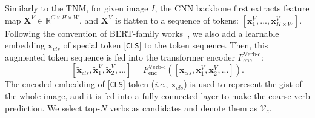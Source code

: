 \documentclass[letterpaper]{article} %
\newcommand{\ie}{\textit{i}.\textit{e}.}
\begin{document}

Similarly to the TNM, for given image $I$, the CNN backbone first extracts feature map $\bm{X}^V \in \mathbb{R}^{C\times H\times W}$, and $\bm{X}^V$ is flatten to a sequence of tokens: $[\bm{x}^V_1, ..., \bm{x}^V_{H\times W}]$. Following the convention of BERT-family works~\cite{devlin2018bert}, we also add a learnable embedding $\bm{x}_{cls}$ of special token [\texttt{CLS}] to the token sequence. Then, this augmented token sequence is fed into the transformer encoder $F^{\text{Verb-c}}_{\text{enc}}$:
\begin{equation} \label{equ:6}
    \left[ \tilde{\bm{x}}_{cls}, \tilde{\bm{x}}^V_1, \tilde{\bm{x}}^V_2, ... \right] = F^{\text{Verb-c}}_{\text{enc}} (\left[\bm{x}_{cls}, \bm{x}^V_1, \bm{x}^V_2, ... \right]).
\end{equation}
The encoded embedding of [\texttt{CLS}] token (\ie, $\tilde{\bm{x}}_{cls}$) is used to represent the gist of the whole image, and it is fed into a fully-connected layer to make the coarse verb prediction. We select top-$N$ verbs as candidates and denote them as $\mathcal{V}_c$.



\end{document}
